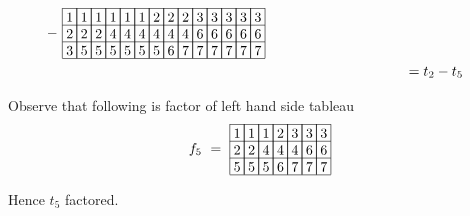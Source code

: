 {\begin{align*}
{}
{\def\lr#1{\multicolumn{1}{|@{\hspace{.6ex}}c@{\hspace{.6ex}}|}{\raisebox{-.3ex}{$#1$}}}
\raisebox{-.6ex}{$\ -\ \begin{array}[c]{*{14}c}\cline{1-14}
\lr{1}&\lr{1}&\lr{1}&\lr{1}&\lr{1}&\lr{1}&\lr{2}&\lr{2}&\lr{2}&\lr{3}&\lr{3}&\lr{3}&\lr{3}&\lr{3}\\\cline{1-14}
\lr{2}&\lr{2}&\lr{2}&\lr{4}&\lr{4}&\lr{4}&\lr{4}&\lr{4}&\lr{4}&\lr{6}&\lr{6}&\lr{6}&\lr{6}&\lr{6}\\\cline{1-14}
\lr{3}&\lr{5}&\lr{5}&\lr{5}&\lr{5}&\lr{5}&\lr{5}&\lr{6}&\lr{7}&\lr{7}&\lr{7}&\lr{7}&\lr{7}&\lr{7}\\\cline{1-14}
\end{array}$}
}\\
&\hspace{100pt}
= t_2 - t_5 
\end{align*}

Observe that following is factor of left hand side tableau 
\[
{\def\lr#1{\multicolumn{1}{|@{\hspace{.6ex}}c@{\hspace{.6ex}}|}{\raisebox{-.3ex}{$#1$}}}
\raisebox{-.6ex}{$f_5\ =\ \begin{array}[c]{*{7}c}\cline{1-7}
\lr{1}&\lr{1}&\lr{1}&\lr{2}&\lr{3}&\lr{3}&\lr{3}\\\cline{1-7}
\lr{2}&\lr{2}&\lr{4}&\lr{4}&\lr{4}&\lr{6}&\lr{6}\\\cline{1-7}
\lr{5}&\lr{5}&\lr{5}&\lr{6}&\lr{7}&\lr{7}&\lr{7}\\\cline{1-7}
\end{array}$}
}
\]

Hence \(t_5\) factored.

}
